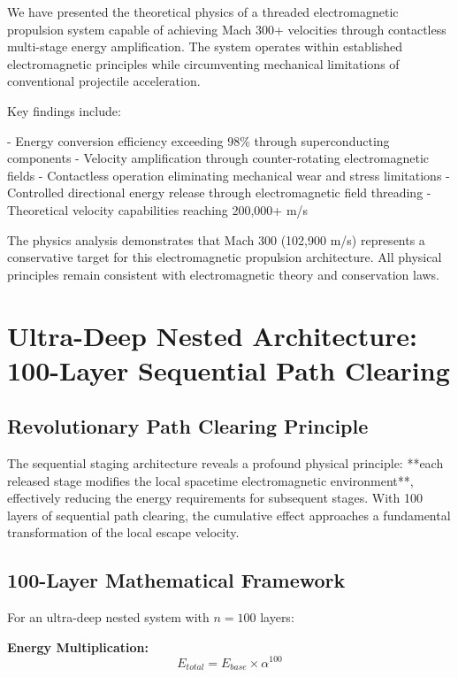 \documentclass[12pt,a4paper]{article}
\begin{document}
We have presented the theoretical physics of a threaded electromagnetic propulsion system capable of achieving Mach 300+ velocities through contactless multi-stage energy amplification. The system operates within established electromagnetic principles while circumventing mechanical limitations of conventional projectile acceleration.

Key findings include:

- Energy conversion efficiency exceeding 98\% through superconducting components
- Velocity amplification through counter-rotating electromagnetic fields  
- Contactless operation eliminating mechanical wear and stress limitations
- Controlled directional energy release through electromagnetic field threading
- Theoretical velocity capabilities reaching 200,000+ m/s

The physics analysis demonstrates that Mach 300 (102,900 m/s) represents a conservative target for this electromagnetic propulsion architecture. All physical principles remain consistent with electromagnetic theory and conservation laws.

\section{Ultra-Deep Nested Architecture: 100-Layer Sequential Path Clearing}

\subsection{Revolutionary Path Clearing Principle}

The sequential staging architecture reveals a profound physical principle: **each released stage modifies the local spacetime electromagnetic environment**, effectively reducing the energy requirements for subsequent stages. With 100 layers of sequential path clearing, the cumulative effect approaches a fundamental transformation of the local escape velocity.

\subsection{100-Layer Mathematical Framework}

For an ultra-deep nested system with $n = 100$ layers:

\textbf{Energy Multiplication:}
\begin{equation}
E_{total} = E_{base} \times \alpha^{100}
\end{equation}
\end{document}
